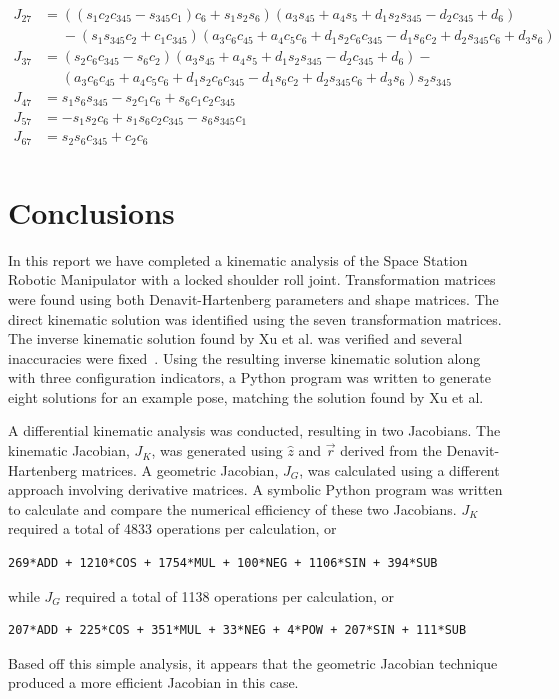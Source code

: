 \documentclass{article}
\begin{document}
\begin{align*}
J_{27} &= \left(\left(s_{1} c_{2} c_{345} - s_{345} c_{1}\right) c_{6} + s_{1} s_{2} s_{6}\right) \left(a_{3} s_{45} + a_{4} s_{5} + d_{1} s_{2} s_{345} - d_{2} c_{345} + d_{6}\right) \\
       &\phantom{=}- \left(s_{1} s_{345} c_{2} + c_{1} c_{345}\right) \left(a_{3} c_{6} c_{45} + a_{4} c_{5} c_{6} + d_{1} s_{2} c_{6} c_{345} - d_{1} s_{6} c_{2} + d_{2} s_{345} c_{6} + d_{3} s_{6}\right) \\
J_{37} &= \left(s_{2} c_{6} c_{345} - s_{6} c_{2}\right) \left(a_{3} s_{45} + a_{4} s_{5} + d_{1} s_{2} s_{345} - d_{2} c_{345} + d_{6}\right) - \\
       &\phantom{=}\left(a_{3} c_{6} c_{45} + a_{4} c_{5} c_{6} + d_{1} s_{2} c_{6} c_{345} - d_{1} s_{6} c_{2} + d_{2} s_{345} c_{6} + d_{3} s_{6}\right) s_{2} s_{345} \\
J_{47} &= s_{1} s_{6} s_{345} - s_{2} c_{1} c_{6} + s_{6} c_{1} c_{2} c_{345} \\
J_{57} &= - s_{1} s_{2} c_{6} + s_{1} s_{6} c_{2} c_{345} - s_{6} s_{345} c_{1} \\
J_{67} &= s_{2} s_{6} c_{345} + c_{2} c_{6} \\
\end{align*}

\clearpage
\section{Conclusions}
In this report we have completed a kinematic analysis of the Space Station Robotic Manipulator with a locked shoulder roll joint.
Transformation matrices were found using both Denavit-Hartenberg parameters and shape matrices.
The direct kinematic solution was identified using the seven transformation matrices.
The inverse kinematic solution found by Xu et al. was verified and several inaccuracies were fixed~\cite{xu2014analytical}.
Using the resulting inverse kinematic solution along with three configuration indicators, a Python program was written to generate eight solutions for an example pose, matching the solution found by Xu et al.

A differential kinematic analysis was conducted, resulting in two Jacobians.
The kinematic Jacobian, $J_K$, was generated using $\hat{z}$ and $\vec{r}$ derived from the Denavit-Hartenberg matrices.
A geometric Jacobian, $J_G$, was calculated using a different approach involving derivative matrices.
A symbolic Python program was written to calculate and compare the numerical efficiency of these two Jacobians.
$J_K$ required a total of 4833 operations per calculation, or
\begin{verbatim}
269*ADD + 1210*COS + 1754*MUL + 100*NEG + 1106*SIN + 394*SUB
\end{verbatim}
while $J_G$ required a total of 1138 operations per calculation, or
\begin{verbatim}
207*ADD + 225*COS + 351*MUL + 33*NEG + 4*POW + 207*SIN + 111*SUB
\end{verbatim}
Based off this simple analysis, it appears that the geometric Jacobian technique produced a more efficient Jacobian in this case.
\end{document}

